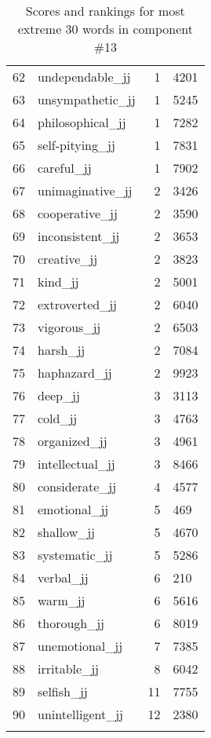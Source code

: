 \begin{longtable}[!htbp]{| rlr@{.}l |}
    62 & undependable\_jj & 1 & 4201 \\
    63 & unsympathetic\_jj & 1 & 5245 \\
    64 & philosophical\_jj & 1 & 7282 \\
    65 & self-pitying\_jj & 1 & 7831 \\
    66 & careful\_jj & 1 & 7902 \\
    67 & unimaginative\_jj & 2 & 3426 \\
    68 & cooperative\_jj & 2 & 3590 \\
    69 & inconsistent\_jj & 2 & 3653 \\
    70 & creative\_jj & 2 & 3823 \\
    71 & kind\_jj & 2 & 5001 \\
    72 & extroverted\_jj & 2 & 6040 \\
    73 & vigorous\_jj & 2 & 6503 \\
    74 & harsh\_jj & 2 & 7084 \\
    75 & haphazard\_jj & 2 & 9923 \\
    76 & deep\_jj & 3 & 3113 \\
    77 & cold\_jj & 3 & 4763 \\
    78 & organized\_jj & 3 & 4961 \\
    79 & intellectual\_jj & 3 & 8466 \\
    80 & considerate\_jj & 4 & 4577 \\
    81 & emotional\_jj & 5 & 469 \\
    82 & shallow\_jj & 5 & 4670 \\
    83 & systematic\_jj & 5 & 5286 \\
    84 & verbal\_jj & 6 & 210 \\
    85 & warm\_jj & 6 & 5616 \\
    86 & thorough\_jj & 6 & 8019 \\
    87 & unemotional\_jj & 7 & 7385 \\
    88 & irritable\_jj & 8 & 6042 \\
    89 & selfish\_jj & 11 & 7755 \\
    90 & unintelligent\_jj & 12 & 2380 \\
    \hline
    \caption{Scores and rankings for most extreme 30 words in component \#13} \\
\end{longtable}
